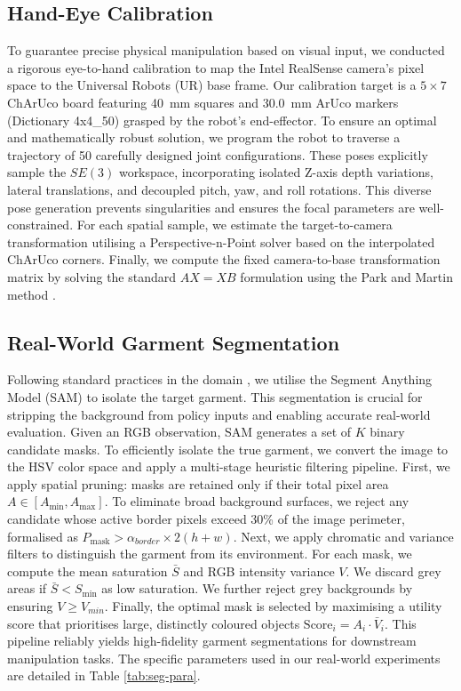 \documentclass[journal]{IEEEtran}
\newcommand{\addinfo}[1]{\textcolor{myPurple}{#1}}
\begin{document}
\subsection{Hand-Eye Calibration} \label{sec:calibration}

\addinfo{To guarantee precise physical manipulation based on visual input, we conducted a rigorous eye-to-hand calibration to map the Intel RealSense camera's pixel space to the Universal Robots (UR) base frame. Our calibration target is a $5 \times 7$ ChArUco board \cite{garrido2014automatic} featuring 40~mm squares and 30.0~mm ArUco markers (Dictionary 4x4\_50) grasped by the robot's end-effector. To ensure an optimal and mathematically robust solution, we program the robot to traverse a trajectory of 50 carefully designed joint configurations. These poses explicitly sample the $SE(3)$ workspace, incorporating isolated Z-axis depth variations, lateral translations, and decoupled pitch, yaw, and roll rotations. This diverse pose generation prevents singularities and ensures the focal parameters are well-constrained. For each spatial sample, we estimate the target-to-camera transformation utilising a Perspective-n-Point solver based on the interpolated ChArUco corners. Finally, we compute the fixed camera-to-base transformation matrix by solving the standard $AX=XB$ formulation using the Park and Martin method \cite{park1994robot}.}




\subsection{Real-World Garment Segmentation} \label{sec:real-world-cloth-seg}
\addinfo{Following standard practices in the domain \cite{canberk2023cloth, lin2022learning, kadi2025draper}, we utilise the Segment Anything Model (SAM) \cite{kirillov2023segment} to isolate the target garment. This segmentation is crucial for stripping the background from policy inputs and enabling accurate real-world evaluation. Given an RGB observation, SAM generates a set of $K$ binary candidate masks. To efficiently isolate the true garment, we convert the image to the HSV color space and apply a multi-stage heuristic filtering pipeline. First, we apply spatial pruning: masks are retained only if their total pixel area $A \in [A_{\text{min}}, A_{\text{max}}]$. To eliminate broad background surfaces, we reject any candidate whose active border pixels exceed 30\% of the image perimeter, formalised as $P_{\text{mask}} > \alpha_{border} \times 2(h + w)$. Next, we apply chromatic and variance filters to distinguish the garment from its environment. For each mask, we compute the mean saturation $\bar{S}$ and RGB intensity variance $V$. We discard grey areas if $\bar{S} < S_{\text{min}}$ as low saturation. We further reject grey backgrounds by ensuring $ V \geq V_{min}$. Finally, the optimal mask is selected by maximising a utility score that prioritises large, distinctly coloured objects $\text{Score}_i = A_i \cdot \bar{V}_i$. This pipeline reliably yields high-fidelity garment segmentations for downstream manipulation tasks. The specific parameters used in our real-world experiments are detailed in Table \ref{tab:seg-para}.}
\end{document}
